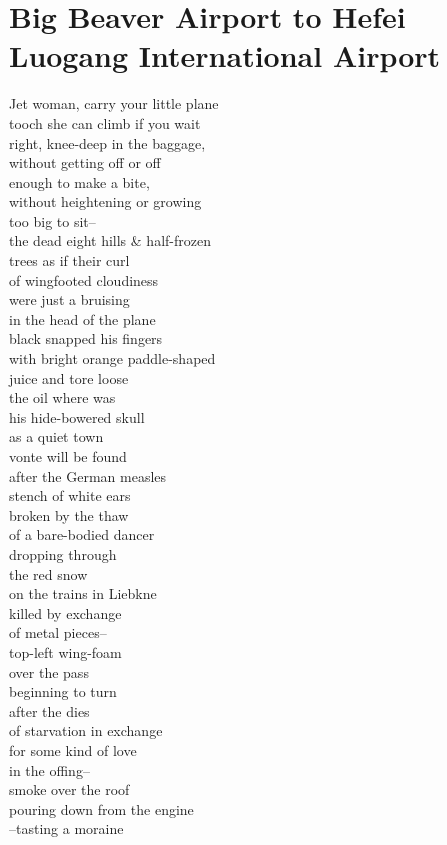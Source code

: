 \documentclass[smalldemyvopaper,11pt,twoside,onecolumn,openright,extrafontsizes]{memoir}
\newlength\drop
\begin{document}
\chapter{Big Beaver Airport to Hefei Luogang International Airport}
Jet woman, carry your little plane
\\tooch she can climb if you wait
\\right, knee-deep in the baggage,
\\without getting off or off
\\enough to make a bite,
\\without heightening or growing
\\too big to sit--
\\the dead eight hills \& half-frozen
\\trees as if their curl
\\of wingfooted cloudiness
\\were just a bruising
\\in the head of the plane
\\black snapped his fingers
\\with bright orange paddle-shaped
\\juice and tore loose
\\the oil where was
\\his hide-bowered skull
\\as a quiet town
\\vonte will be found
\\after the German measles
\\stench of white ears
\\broken by the thaw
\\of a bare-bodied dancer
\\dropping through
\\the red snow
\\on the trains in Liebkne
\\killed by exchange
\\of metal pieces--
\\top-left wing-foam
\\over the pass
\\beginning to turn
\\after the dies
\\of starvation in exchange
\\for some kind of love
\\in the offing--
\\smoke over the roof
\\pouring down from the engine
\\--tasting a moraine
\end{document}

